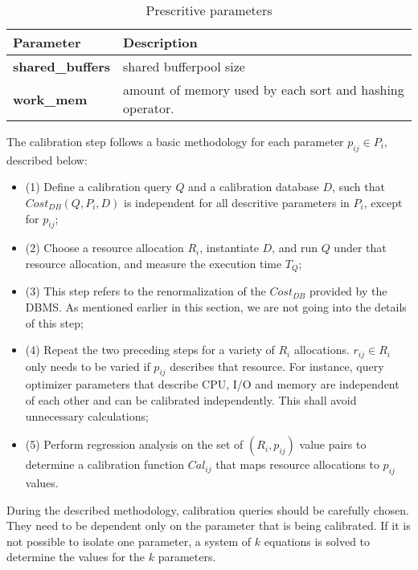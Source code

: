 \begin{table}[ht]
    \centering
    \begin{tabular}{ | l | p{5cm} |}
    \hline
      Parameter & Description  \\ \hline
    \textbf{shared\_buffers} & shared bufferpool size \\ \hline
    \textbf{work\_mem} & amount of memory used by each sort and hashing operator. \\
    \hline
    \end{tabular}
    \caption{Prescritive parameters}
    \label{table:prescritive}
\end{table}

The calibration step follows a basic methodology for each parameter $p_{ij} \in P_{i}$, described below:

\begin{itemize}
 \item (1) Define a calibration query $Q$ and a calibration database $D$, such that $Cost_{DB}(Q,P_{i},D)$ is independent for all descritive parameters in $P_{i}$, except for $p_{ij}$; \\
  \item (2) Choose a resource allocation $R_{i}$, instantiate $D$, and run $Q$ under that resource allocation, and measure the execution time $T_{Q}$; \\
  \item (3) This step refers to the renormalization of the $Cost_{DB}$ provided by the DBMS. As mentioned earlier in this section, we are not going into the details of this step; \\
  \item (4) Repeat the two preceding steps for a variety of $R_{i}$ allocations. $r_{ij} \in R_{i}$ only needs to be varied if $p_{ij}$ describes that resource. For instance, query optimizer parameters that describe CPU, I/O and memory are independent of each other and can be calibrated independently. This shall avoid unnecessary calculations; \\
  \item (5) Perform regression analysis on the set of $(R_{i},p_{ij})$ value pairs to determine a calibration function $Cal_{ij}$ that maps resource allocations to $p_{ij}$ values. \\
\end{itemize}

During the described methodology, calibration queries should be carefully chosen. They need to be dependent only on the parameter that is being calibrated. If it is not possible to isolate one parameter, a system of $k$ equations is solved to determine the values for the $k$ parameters.

